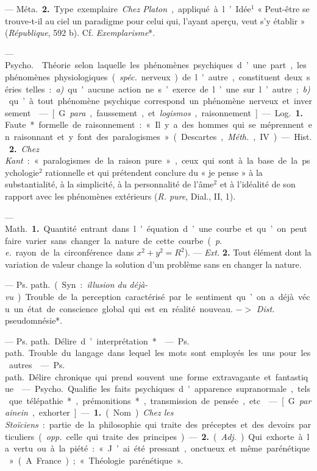 \begin{itemize}[leftmargin=1cm, label=, itemsep=1pt]
— \si{Méta.} {\bf 2.} Type exemplaire. {\it Chez Platon}, appliqué à
l’Idée$^1$ « Peut-être se trouve-t-il au ciel un paradigme pour celui qui,
l'ayant aperçu, veut s'y établir » ({\it République}, 592 b). Cf. {\it
Exemplarisme}*.

 — \si{Psycho.}  Théorie selon laquelle les
phénomènes psychiques d’une part, les phénomènes physiologiques ({\it spéc.}
nerveux) de l'autre, constituent deux séries telles : {\it a)} qu'aucune
action ne s’exerce de l’une sur l’autre ; {\it b)} qu’à tout phénomène
psychique correspond un phénomène nerveux et inversement.

 — [G. {\it para}, faussement, et {\it logismos},
raisonnement] — \si{Log.} {\bf 1.} Faute* formelle de raisonnement : « Il y a
des hommes qui se méprennent
en raisonnant et y font des paralogismes » (Descartes, {\it Méth.}, IV).—
\si{Hist.} {\bf 2.} {\it Chez Kant} : « paralogismes de la raison pure »,
ceux qui sont à la base de la psychologie$^2$ rationnelle et qui prétendent
conclure du « je pense » à la substantialité, à la simplicité, à la
personnalité de l’âme$^2$ et à l’idéalité de son rapport avec les phénomènes
extérieurs ({\it R. pure}, Dial., II, 1).

 — \si{Math.} {\bf 1.} Quantité entrant dans l'équation d’une
courbe et qu’on peut faire varier sans changer la nature de cette courbe
({\it p. e.} rayon de la circonférence dans $x^2+ y^2=R^2$). — {\it Ext.}
{\bf 2.} Tout élément dont la variation de valeur change la solution d’un
problème sans en changer la nature.

 — \si{Ps. path.} (Syn. : {\it illusion du déjà-vu}). Trouble
de la perception caractérisé par le sentiment qu’on a déjà vécu un état de
conscience global qui est en réalité nouveau. $->$ {\it Dist.} pseudomnésie*.

 — \si{Ps. path.} Délire d’interprétation*.

 — \si{Ps. path.} Trouble du langage dans lequel les mots sont
employés les uns pour les autres.

 — \si{Ps. path.} Délire chronique qui prend souvent une
forme extravagante et fantastique.

 — \si{Psycho.} Qualifie les faits psychiques d'apparence
supranormale, tels que télépathie*, prémonitions*, transmission de pensée,
etc.

 — [G. {\it parainein}, exhorter] — {\bf 1.} (Nom) {\it Chez
les Stoïciens} : partie de la philosophie qui traite des préceptes et des
devoirs particuliers ({\it opp.} celle qui traite des principes).
— {\bf 2.} ({\it Adj.}). Qui exhorte à la vertu ou à la piété : « J’ai été
pressant, onctueux et même parénétique » (A. France) ; « Théologie
parénétique ».


\end{itemize}
